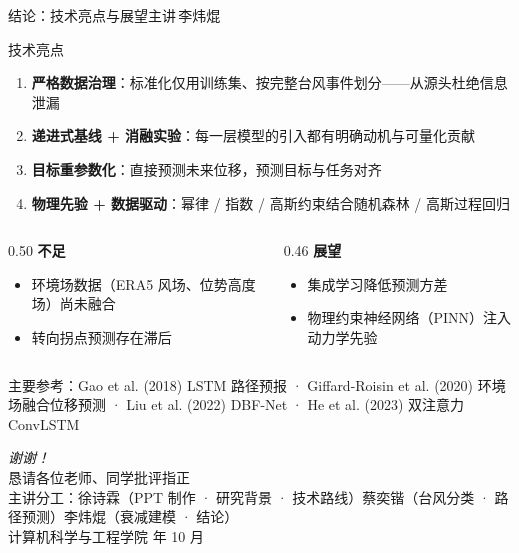 \documentclass{beamer}
\providecommand{\calligra}{\itshape}
\newcommand{\speaker}[1]{\hfill{\normalfont\scriptsize\kaishu\color{uestc!30!white}主讲\,#1}}
\begin{document}
\begin{frame}{结论：技术亮点与展望\speaker{李炜焜}}
    \begin{block}{技术亮点}
        \begin{enumerate}\small
            \item \textbf{严格数据治理}：标准化仅用训练集、按完整台风事件划分——从源头杜绝信息泄漏
            \item \textbf{递进式基线 + 消融实验}：每一层模型的引入都有明确动机与可量化贡献
            \item \textbf{目标重参数化}：直接预测未来位移，预测目标与任务对齐
            \item \textbf{物理先验 + 数据驱动}：幂律 / 指数 / 高斯约束结合随机森林 / 高斯过程回归
        \end{enumerate}
    \end{block}
    \begin{columns}
        \begin{column}{0.50\textwidth}
            \textbf{不足}
            \begin{itemize}\small
                \item 环境场数据（ERA5 风场、位势高度场）尚未融合
                \item 转向拐点预测存在滞后
            \end{itemize}
        \end{column}
        \begin{column}{0.46\textwidth}
            \textbf{展望}
            \begin{itemize}\small
                \item 集成学习降低预测方差
                \item 物理约束神经网络（PINN）注入动力学先验
            \end{itemize}
        \end{column}
    \end{columns}
    \vspace{0.3em}
    {\scriptsize\color{halfgray} 主要参考：Gao et al. (2018) LSTM 路径预报 · Giffard-Roisin et al. (2020) 环境场融合位移预测 · Liu et al. (2022) DBF-Net · He et al. (2023) 双注意力 ConvLSTM}
\end{frame}

\begin{frame}
    \begin{center}
        {\Huge\calligra 谢谢！}\\[1.2em]
        \large 恳请各位老师、同学批评指正\\[1em]
        \normalsize
        主讲分工：徐诗霖（PPT 制作 · 研究背景 · 技术路线）\quad 蔡奕锴（台风分类 · 路径预测）\quad 李炜焜（衰减建模 · 结论）\\[0.6em]
        \footnotesize
        计算机科学与工程学院  年 10 月
    \end{center}
\end{frame}
\end{document}
